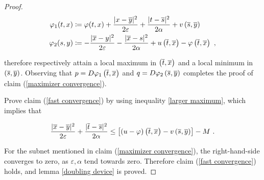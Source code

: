 \begin{lemma}
\begin{proof}
	 		\begin{align*}
	 			\varphi_1(t, x)  &\coloneqq \varphi(t, x) + \frac{\lvert x - \overline{y} \rvert^2}{2 \varepsilon} + \frac{\lvert t - \overline{s} \rvert^2}{2 \alpha} + v\left(\overline{s}, \overline{y}\right) \\
	 			\varphi_2(s, y) &\coloneqq - \frac{\lvert \overline{x} - y \rvert^2}{2 \varepsilon} - \frac{\lvert \overline{x} - s \rvert^2}{2 \alpha} + u\left(\overline{t}, \overline{x}\right) - \varphi\left(\overline{t}, \overline{x}\right) \ ,
	 		\end{align*}
	 		
	 		therefore respectively attain a local maximum in $ \left(\overline{t}, \overline{x}\right) $ and a local minimum in $ \left(\overline{s}, \overline{y}\right) $. Observing that $ p = D\varphi_1\left(\overline{t}, \overline{x}\right) $ and $ q = D\varphi_2\left(\overline{s}, \overline{y}\right) $ completes the proof of claim (\ref{maximizer convergence}).
	 		
	 		Prove claim (\ref{fast convergence}) by using inequality \eqref{larger maximum}, which implies that
	 		
	 		\begin{equation*}
	 			 \frac{\lvert \overline{x} - \overline{y} \rvert^2}{2 \varepsilon} + \frac{\lvert \overline{t} - \overline{s} \rvert^2}{2 \alpha} \leq \left[(u - \varphi)\left(\overline{t}, \overline{x}\right) - v\left(\overline{s}, \overline{y}\right) \right] - M \ .
	 		\end{equation*}
	 		
	 		For the subnet mentioned in claim (\ref{maximizer convergence}), the right-hand-side converges to zero, as $ \varepsilon, \alpha $ tend towards zero. Therefore claim (\ref{fast convergence}) holds, and lemma \ref{doubling device} is proved.
	\end{proof}
\end{lemma}